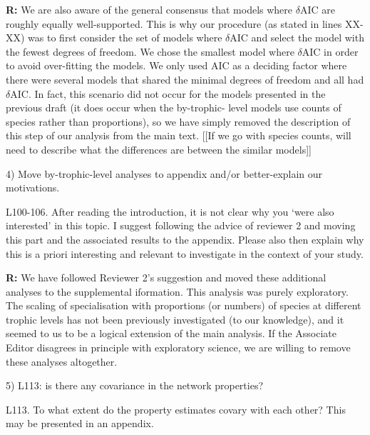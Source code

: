 \documentclass[12pt]{letter}
\newenvironment{refquote}{\bigskip \begin{it}}{\end{it}\smallskip}
\begin{document}
  \textbf{R:} We are also aware of the general consensus    that models where
  $\delta$AIC are roughly equally well-supported. This is why our
  procedure (as stated in lines XX-XX) was to first consider the set of models
  where $\delta$AIC and select the model with the fewest degrees of
  freedom. We chose the smallest model where $\delta$AIC in order to
  avoid over-fitting the models. We only used AIC as a deciding factor where
  there were several models that shared the minimal degrees of freedom and all
  had $\delta$AIC.  In fact, this scenario did not occur for the
  models presented in the previous draft   (it does occur when the by-trophic-
  level models use counts of species rather than proportions), so we have simply
  removed the description of this step of our analysis from the main text. [[If we go with species counts, will need to describe what the differences are between the similar models]]
  

  4) Move by-trophic-level analyses to appendix and/or better-explain our motivations.


  \begin{refquote}

    L100-106. After reading the introduction, it is not clear why you ‘were
    also interested’ in this topic. I suggest following the advice of reviewer
    2 and moving this part and the associated results to the appendix. Please
    also then explain why this is a priori interesting and relevant to
    investigate in the context of your study.

  \end{refquote}

  \textbf{R:} We have followed Reviewer 2's suggestion and 
  moved these additional analyses to the supplemental 
  iformation. This analysis was purely exploratory. The 
  scaling of specialisation with proportions (or numbers) 
  of species at different trophic levels has not been 
  previously investigated (to our knowledge), and it 
  seemed to us to be a logical extension of the main 
  analysis. If the Associate Editor disagrees in principle 
  with exploratory science, we are willing to remove these 
  analyses altogether.


  5) L113: is there any covariance in the network properties?

  \begin{refquote}

    L113. To what extent do the property estimates covary with each other?
    This may be presented in an appendix.

  \end{refquote}
\end{document}
